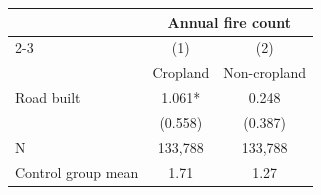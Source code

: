 {
\def\sym#1{\ifmmode^{#1}\else\(^{#1}\)\fi}
\begin{tabular}{l*{2}{c}}
\hline\hline
                         &\multicolumn{2}{c}{Annual fire count}\\\cmidrule(lr){2-3}
                         &\multicolumn{1}{c}{(1)}&\multicolumn{1}{c}{(2)}\\
                         &\multicolumn{1}{c}{Cropland}&\multicolumn{1}{c}{Non-cropland}\\
\hline
Road built               &       1.061*  &       0.248   \\
                         &     (0.558)   &     (0.387)   \\
\hline
N                        &     133,788   &     133,788   \\
Control group mean       &        1.71   &        1.27   \\
\hline\hline
\end{tabular}
}
